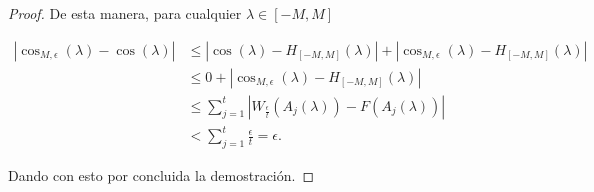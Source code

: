 \begin{proof}
    De esta manera, para cualquier $\lambda \in [-M, M]$

    \begin{equation}
        \begin{split}
            |\cos_{M,\epsilon}(\lambda) - \cos(\lambda)| 
            &\leq
            |\cos(\lambda) -  H_{[- M, M]}(\lambda)|
            + 
            | \cos_{M,\epsilon}(\lambda) -  H_{[- M, M]}(\lambda)|  \\
            &\leq  0 
            + | \cos_{M,\epsilon}(\lambda) -  H_{[- M, M]}(\lambda)| \\
            & \leq  \sum_{j=1}^t 
            |  W_{ \frac{\epsilon}{t}}(A_j(\lambda)) 
            -
            F( A_j(\lambda))
             | \\
             & <   \sum_{j=1}^t \frac{\epsilon}{t} = \epsilon .
        \end{split}
    \end{equation}

    Dando con esto por concluida la demostración. 
\end{proof}

